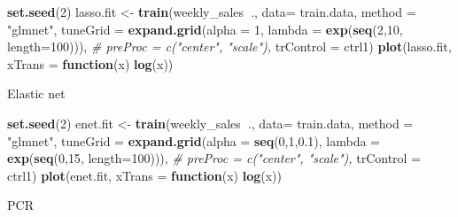 \documentclass[]{article}
\newenvironment{Shaded}{\begin{snugshade}}{\end{snugshade}}
\newcommand{\CommentTok}[1]{\textcolor[rgb]{0.56,0.35,0.01}{\textit{#1}}}
\newcommand{\ControlFlowTok}[1]{\textcolor[rgb]{0.13,0.29,0.53}{\textbf{#1}}}
\newcommand{\DataTypeTok}[1]{\textcolor[rgb]{0.13,0.29,0.53}{#1}}
\newcommand{\DecValTok}[1]{\textcolor[rgb]{0.00,0.00,0.81}{#1}}
\newcommand{\FloatTok}[1]{\textcolor[rgb]{0.00,0.00,0.81}{#1}}
\newcommand{\KeywordTok}[1]{\textcolor[rgb]{0.13,0.29,0.53}{\textbf{#1}}}
\newcommand{\NormalTok}[1]{#1}
\newcommand{\OperatorTok}[1]{\textcolor[rgb]{0.81,0.36,0.00}{\textbf{#1}}}
\newcommand{\StringTok}[1]{\textcolor[rgb]{0.31,0.60,0.02}{#1}}
\begin{document}
\begin{Shaded}
\begin{Highlighting}[]
\KeywordTok{set.seed}\NormalTok{(}\DecValTok{2}\NormalTok{)}
\NormalTok{lasso.fit <-}\StringTok{ }\KeywordTok{train}\NormalTok{(weekly_sales}\OperatorTok{~}\NormalTok{.,}
                   \DataTypeTok{data=}\NormalTok{ train.data,}
                   \DataTypeTok{method =} \StringTok{"glmnet"}\NormalTok{,}
                   \DataTypeTok{tuneGrid =} \KeywordTok{expand.grid}\NormalTok{(}\DataTypeTok{alpha =} \DecValTok{1}\NormalTok{, }
                                          \DataTypeTok{lambda =} \KeywordTok{exp}\NormalTok{(}\KeywordTok{seq}\NormalTok{(}\DecValTok{2}\NormalTok{,}\DecValTok{10}\NormalTok{, }\DataTypeTok{length=}\DecValTok{100}\NormalTok{))),}
                   \CommentTok{# preProc = c("center", "scale"),}
                   \DataTypeTok{trControl =}\NormalTok{ ctrl1)}
\KeywordTok{plot}\NormalTok{(lasso.fit, }\DataTypeTok{xTrans =} \ControlFlowTok{function}\NormalTok{(x) }\KeywordTok{log}\NormalTok{(x))}
\end{Highlighting}
\end{Shaded}

Elastic net

\begin{Shaded}
\begin{Highlighting}[]
\KeywordTok{set.seed}\NormalTok{(}\DecValTok{2}\NormalTok{)}
\NormalTok{enet.fit <-}\StringTok{ }\KeywordTok{train}\NormalTok{(weekly_sales}\OperatorTok{~}\NormalTok{.,}
                   \DataTypeTok{data=}\NormalTok{ train.data,}
                   \DataTypeTok{method =} \StringTok{"glmnet"}\NormalTok{,}
                   \DataTypeTok{tuneGrid =} \KeywordTok{expand.grid}\NormalTok{(}\DataTypeTok{alpha =} \KeywordTok{seq}\NormalTok{(}\DecValTok{0}\NormalTok{,}\DecValTok{1}\NormalTok{,}\FloatTok{0.1}\NormalTok{), }
                                          \DataTypeTok{lambda =} \KeywordTok{exp}\NormalTok{(}\KeywordTok{seq}\NormalTok{(}\DecValTok{0}\NormalTok{,}\DecValTok{15}\NormalTok{, }\DataTypeTok{length=}\DecValTok{100}\NormalTok{))),}
                   \CommentTok{# preProc = c("center", "scale"),}
                   \DataTypeTok{trControl =}\NormalTok{ ctrl1)}
\KeywordTok{plot}\NormalTok{(enet.fit, }\DataTypeTok{xTrans =} \ControlFlowTok{function}\NormalTok{(x) }\KeywordTok{log}\NormalTok{(x))}
\end{Highlighting}
\end{Shaded}

PCR
\end{document}
